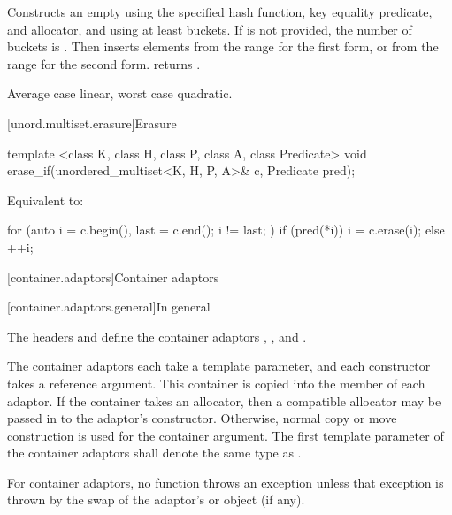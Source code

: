 \begin{itemdescr}
\pnum\effects
Constructs an empty  using the
specified hash function, key equality predicate, and allocator, and
using at least  buckets. If  is not
provided, the number of buckets is . Then
inserts elements from the range 
for the first form, or from the range
 for the second form.
 returns .

\pnum\complexity Average case linear, worst case quadratic.
\end{itemdescr}

[unord.multiset.erasure]{Erasure}

%
\begin{itemdecl}
template <class K, class H, class P, class A, class Predicate>
  void erase_if(unordered_multiset<K, H, P, A>& c, Predicate pred);
\end{itemdecl}

\begin{itemdescr}
\pnum
\effects
Equivalent to:
\begin{codeblock}
for (auto i = c.begin(), last = c.end(); i != last; ) {
  if (pred(*i)) {
    i = c.erase(i);
  } else {
    ++i;
  }
}
\end{codeblock}
\end{itemdescr}

[container.adaptors]{Container adaptors}

[container.adaptors.general]{In general}

\pnum
The headers  and  define the container adaptors
, , and .

\pnum
The container adaptors each take a  template parameter, and each constructor takes
a  reference argument. This container is copied into the  member
of each adaptor. If the container takes an allocator, then a compatible allocator may be passed in
to the adaptor's constructor. Otherwise, normal copy or move construction is used for the container
argument.
The first template parameter  of the container adaptors
shall denote the same type as .

\pnum
For container adaptors, no  function throws an exception unless that
exception is thrown by the swap of the adaptor's  or
 object (if any).

